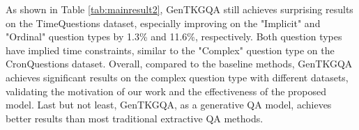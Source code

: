 \documentclass[11pt]{article}
\begin{document}
As shown in Table \ref{tab:mainresult2}, GenTKGQA still achieves surprising results on the TimeQuestions dataset, especially improving on the "Implicit" and "Ordinal" question types by 1.3\% and 11.6\%, respectively.
Both question types have implied time constraints, similar to the "Complex" question type on the CronQuestions dataset.
Overall, compared to the baseline methods, GenTKGQA achieves significant results on the complex question type with different datasets, validating the motivation of our work and the effectiveness of the proposed model.
Last but not least, GenTKGQA, as a generative QA model, achieves better results than most traditional extractive QA methods.



\begin{table}
\centering
    \caption{Ablation study results on CronQuestions.}
\label{tab:ablation study}
\end{table}
\end{document}
